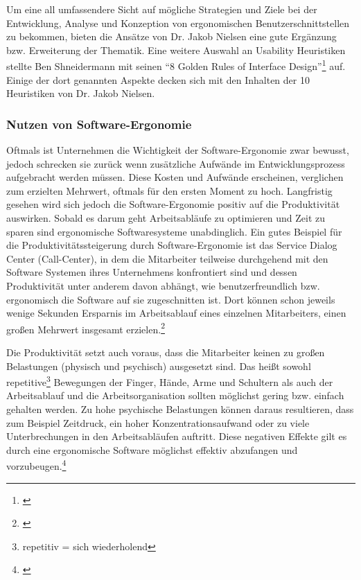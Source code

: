 Um eine all umfassendere Sicht auf mögliche Strategien und Ziele bei der Entwicklung, Analyse und Konzeption von ergonomischen Benutzerschnittstellen zu bekommen, bieten die Ansätze von Dr. Jakob Nielsen eine gute Ergänzung bzw. Erweiterung der Thematik. Eine weitere Auswahl an Usability Heuristiken stellte Ben Shneidermann mit seinen \enquote{8 Golden Rules of Interface Design}\footnote{\cite{Wong2018}} auf. Einige der dort genannten Aspekte decken sich mit den Inhalten der 10 Heuristiken von Dr. Jakob Nielsen.


\subsubsection{Nutzen von Software-Ergonomie}
Oftmals ist Unternehmen die Wichtigkeit der Software-Ergonomie zwar bewusst, jedoch schrecken sie zurück wenn zusätzliche Aufwände im Entwicklungsprozess aufgebracht werden müssen. Diese Kosten und Aufwände erscheinen, verglichen zum erzielten Mehrwert, oftmals für den ersten Moment zu hoch. Langfristig gesehen wird sich jedoch die Software-Ergonomie positiv auf die Produktivität auswirken. Sobald es darum geht Arbeitsabläufe zu optimieren und Zeit zu sparen sind ergonomische Softwaresysteme unabdinglich. Ein gutes Beispiel für die Produktivitätssteigerung durch Software-Ergonomie ist das Service Dialog Center (Call-Center), in dem die Mitarbeiter teilweise durchgehend mit den Software Systemen ihres Unternehmens konfrontiert sind und dessen Produktivität unter anderem davon abhängt, wie benutzerfreundlich bzw. ergonomisch die Software auf sie zugeschnitten ist. Dort können schon jeweils wenige Sekunden Ersparnis im Arbeitsablauf eines einzelnen Mitarbeiters, einen großen Mehrwert insgesamt erzielen.\footnote{\cite[vgl.][19]{Pruemper_Harten2007}}

Die Produktivität setzt auch voraus, dass die Mitarbeiter keinen zu großen Belastungen (physisch und psychisch) ausgesetzt sind. Das heißt sowohl repetitive\footnote{repetitiv = sich wiederholend} Bewegungen der Finger, Hände, Arme und Schultern als auch der Arbeitsablauf und die Arbeitsorganisation sollten möglichst gering bzw. einfach gehalten werden. Zu hohe psychische Belastungen können daraus resultieren, dass zum Beispiel Zeitdruck, ein hoher Konzentrationsaufwand oder zu viele Unterbrechungen in den Arbeitsabläufen auftritt. Diese negativen Effekte gilt es durch eine ergonomische Software möglichst effektiv abzufangen und vorzubeugen.\footnote{\cite[vgl.][19]{Pruemper_Harten2007}}

